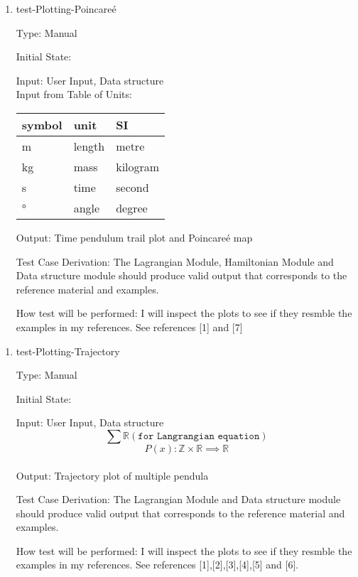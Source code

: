 \documentclass[12pt, titlepage]{article}
\begin{document}
\begin{enumerate}				
	\item{test-Plotting-Poincare\'{e}\\}
	
	Type: Manual
	
	Initial State: 
	
	Input: User Input, Data structure\\
	Input from Table of Units:\\
  \noindent \begin{tabular}{l l l} 
    \toprule		
    \textbf{symbol} & \textbf{unit} & \textbf{SI}\\
    \midrule 
    \si{\metre} & length & metre\\
    \si{\kilogram} & mass & kilogram\\
    \si{\second} & time & second\\
    \si{\degree} & angle & degree\\
    \bottomrule
  \end{tabular}
	
	Output: Time pendulum trail plot and Poincare\'{e} map
	
	Test Case Derivation: The Lagrangian Module, Hamiltonian Module and Data structure module should produce valid
	output that corresponds to the reference material and examples.
	
	How test will be performed: I will inspect the plots to see if 
	they resmble  the examples in my references. See
        references [1] and [7] 
\end{enumerate} 

\begin{enumerate}				
	\item{test-Plotting-Trajectory\\}
	
	Type: Manual
	
	Initial State: 
	
	Input: User Input, Data structure
$$\sum \mathbb{R} (\texttt{for Langrangian equation})$$
$$ P(x) :\mathbb{Z} \times \mathbb{R} \implies \mathbb{R}$$\\
	
	Output: Trajectory plot of multiple pendula
	
	Test Case Derivation: The Lagrangian Module and Data structure module should produce valid
	output that corresponds to the reference material and examples.
	
	How test will be performed: I will inspect the plots to see if 
	they resmble the examples in my references. See references [1],[2],[3],[4],[5] and [6].
\end{enumerate}
\end{document}
